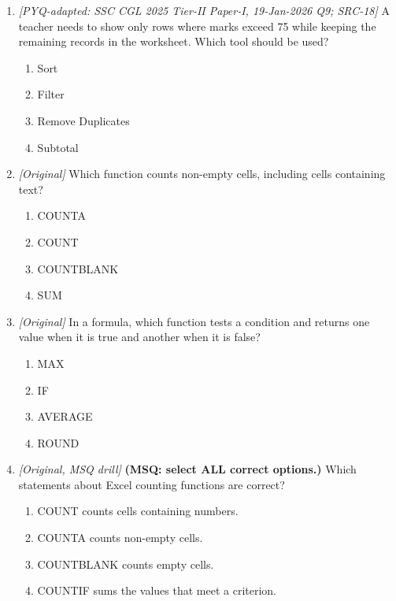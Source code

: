 \begin{enumerate}[label=\textbf{Q\arabic*.}, leftmargin=*]
\item \textit{[PYQ-adapted: SSC CGL 2025 Tier-II Paper-I, 19-Jan-2026 Q9; SRC-18]} A teacher needs to show only rows where marks exceed 75 while keeping the
  remaining records in the worksheet. Which tool should be used?
  \begin{enumerate}[label=\Alph*.]
\item Sort
   \item Filter
   \item Remove Duplicates
   \item Subtotal
  \end{enumerate}

\item \textit{[Original]} Which function counts non-empty cells, including cells containing text?
  \begin{enumerate}[label=\Alph*.]
\item COUNTA
   \item COUNT
   \item COUNTBLANK
   \item SUM
  \end{enumerate}

\item \textit{[Original]} In a formula, which function tests a condition and returns one value when it
  is true and another when it is false?
  \begin{enumerate}[label=\Alph*.]
\item MAX
   \item IF
   \item AVERAGE
   \item ROUND
  \end{enumerate}

\item \textit{[Original, MSQ drill]} \textbf{(MSQ: select ALL correct options.)} Which statements about Excel
  counting functions are correct?
  \begin{enumerate}[label=\Alph*.]
\item COUNT counts cells containing numbers.
   \item COUNTA counts non-empty cells.
   \item COUNTBLANK counts empty cells.
   \item COUNTIF sums the values that meet a criterion.
  \end{enumerate}

\end{enumerate}
